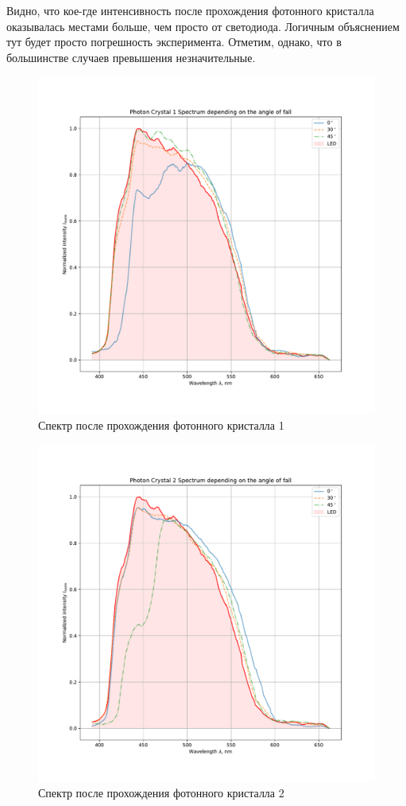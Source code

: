 \documentclass[a4paper, 12pt]{article}
\begin{document}
Видно, что кое-где интенсивность после прохождения фотонного кристалла оказывалась местами больше, чем просто от светодиода. Логичным объяснением тут будет просто погрешность эксперимента. Отметим, однако, что в большинстве случаев превышения незначительные.

\begin{figure}[H]
	\centering
	\includegraphics[width=0.7\linewidth]{1.pdf}
	\caption{Спектр после прохождения фотонного кристалла 1}
	\label{fig:1}
\end{figure}

\begin{figure}[H]
	\centering
	\includegraphics[width=0.7\linewidth]{2.pdf}
	\caption{Спектр после прохождения фотонного кристалла 2}
	\label{fig:2}
\end{figure}
\end{document}
